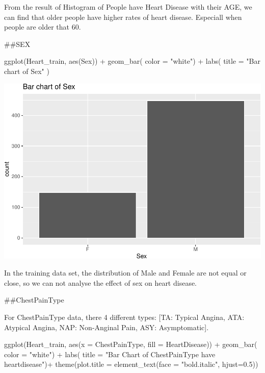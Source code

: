 \documentclass[
]{article}
\newenvironment{Shaded}{\begin{snugshade}}{\end{snugshade}}
\newcommand{\AttributeTok}[1]{\textcolor[rgb]{0.77,0.63,0.00}{#1}}
\newcommand{\FloatTok}[1]{\textcolor[rgb]{0.00,0.00,0.81}{#1}}
\newcommand{\FunctionTok}[1]{\textcolor[rgb]{0.00,0.00,0.00}{#1}}
\newcommand{\NormalTok}[1]{#1}
\newcommand{\SpecialCharTok}[1]{\textcolor[rgb]{0.00,0.00,0.00}{#1}}
\newcommand{\StringTok}[1]{\textcolor[rgb]{0.31,0.60,0.02}{#1}}
\begin{document}
From the result of Histogram of People have Heart Disease with their
AGE, we can find that older people have higher rates of heart disease.
Especiall when people are older that 60.

\#\#SEX

\begin{Shaded}
\begin{Highlighting}[]
\FunctionTok{ggplot}\NormalTok{(Heart\_train, }\FunctionTok{aes}\NormalTok{(Sex)) }\SpecialCharTok{+}
  \FunctionTok{geom\_bar}\NormalTok{( }\AttributeTok{color =} \StringTok{"white"}\NormalTok{) }\SpecialCharTok{+}
  \FunctionTok{labs}\NormalTok{(}
    \AttributeTok{title =} \StringTok{"Bar chart of Sex"}
\NormalTok{  )}
\end{Highlighting}
\end{Shaded}

\includegraphics{PSTAT-131--FINAL-PROJECT-_YIFAN-XU_files/figure-latex/unnamed-chunk-8-1.pdf}

In the training data set, the distribution of Male and Female are not
equal or close, so we can not analyse the effect of sex on heart
disease.

\#\#ChestPainType

For ChestPainType data, there 4 different types: {[}TA: Typical Angina,
ATA: Atypical Angina, NAP: Non-Anginal Pain, ASY: Asymptomatic{]}.

\begin{Shaded}
\begin{Highlighting}[]
\FunctionTok{ggplot}\NormalTok{(Heart\_train, }\FunctionTok{aes}\NormalTok{(}\AttributeTok{x =}\NormalTok{ ChestPainType, }\AttributeTok{fill =}\NormalTok{ HeartDisease)) }\SpecialCharTok{+}
  \FunctionTok{geom\_bar}\NormalTok{( }\AttributeTok{color =} \StringTok{"white"}\NormalTok{) }\SpecialCharTok{+}
  \FunctionTok{labs}\NormalTok{(}
    \AttributeTok{title =} \StringTok{"Bar Chart of ChestPainType have heartdisease"}\NormalTok{)}\SpecialCharTok{+}
  \FunctionTok{theme}\NormalTok{(}\AttributeTok{plot.title =} \FunctionTok{element\_text}\NormalTok{(}\AttributeTok{face =} \StringTok{"bold.italic"}\NormalTok{, }\AttributeTok{hjust=}\FloatTok{0.5}\NormalTok{))}
\end{Highlighting}
\end{Shaded}
\end{document}

